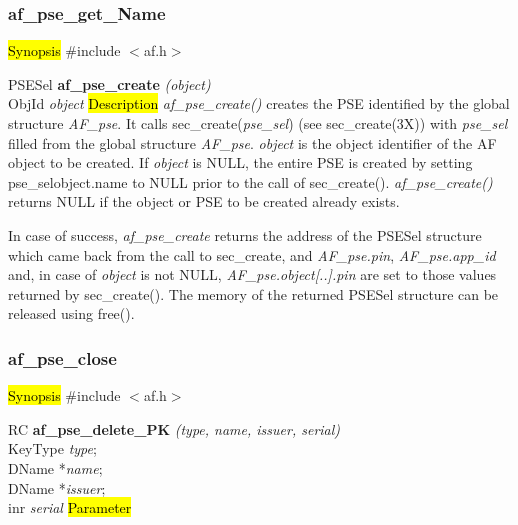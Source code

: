 \subsubsection{af\_pse\_get\_Name}
\label{af_pse_create}
\hl{Synopsis}
\#include $<$af.h$>$

PSESel {\bf *af\_pse\_create} {\em (object)} \\
ObjId {\em *object}
\hl{Description}
{\em af\_pse\_create()} creates the PSE identified by the global structure {\em AF\_pse}.
It calls sec\_create({\em pse\_sel}) (see sec\_create(3X)) 
with {\em pse\_sel} filled from the global structure {\em AF\_pse}.
{\em object} is the object identifier of the AF object to be created.
If {\em object} is NULL, the entire PSE is created by setting pse\_sel\pf object.name
to NULL prior to the call of sec\_create().
{\em af\_pse\_create()} returns NULL if the object or PSE to be created already exists.
 
In case of success, {\em af\_pse\_create} returns the address of the PSESel structure which came back from
the call to sec\_create, and {\em AF\_pse.pin}, {\em AF\_pse.app\_id} and, in case of
{\em object} is not NULL, {\em AF\_pse.object[..].pin} are set to those values returned
by sec\_create(). The memory of the returned PSESel structure can be released using free().

\subsubsection{af\_pse\_close}
\label{af_del_PK}
\hl{Synopsis}
\#include $<$af.h$>$ 

RC {\bf af\_pse\_delete\_PK} {\em (type, name, issuer, serial)} \\
KeyType {\em type}; \\
DName *{\em name}; \\
DName *{\em issuer}; \\
inr {\em serial}
\hl{Parameter}


